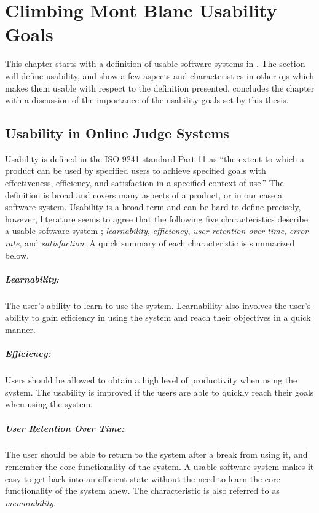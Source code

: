 \chapter{Climbing Mont Blanc Usability Goals}
\label{ch:design}
This chapter starts with a definition of usable software systems in . The section will define usability, and show a few aspects and characteristics in other \glspl{oj} which makes them usable with respect to the definition presented.  concludes the chapter with a discussion of the importance of the usability goals set by this thesis.

\section{Usability in Online Judge Systems}
\label{sec:usability-def}
Usability is defined in the ISO 9241 standard Part 11 \cite{ISO1998} as ``the extent to which a product can be used by specified users to achieve specified goals with effectiveness, efficiency, and satisfaction in a specified context of use.'' The definition is broad and covers many aspects of a product, or in our case a software system. Usability is a broad term and can be hard to define precisely, however, literature seems to agree that the following five characteristics describe a usable software system  \cite{holzinger2005, ferre2001}; \textit{learnability}, \textit{efficiency}, \textit{user retention over time}, \textit{error rate}, and \textit{satisfaction}. A quick summary of each characteristic is summarized below.

\paragraph*{Learnability:} The user's ability to learn to use the system. Learnability also involves the user's ability to gain efficiency in using the system and reach their objectives in a quick manner.

\paragraph*{Efficiency:} Users should be allowed to obtain a high level of productivity when using the system. The usability is improved if the users are able to quickly reach their goals when using the system.

\paragraph*{User Retention Over Time:} The user should be able to return to the system after a break from using it, and remember the core functionality of the system. A usable software system makes it easy to get back into an efficient state without the need to learn the core functionality of the system anew. The characteristic is also referred to as \textit{memorability}.

